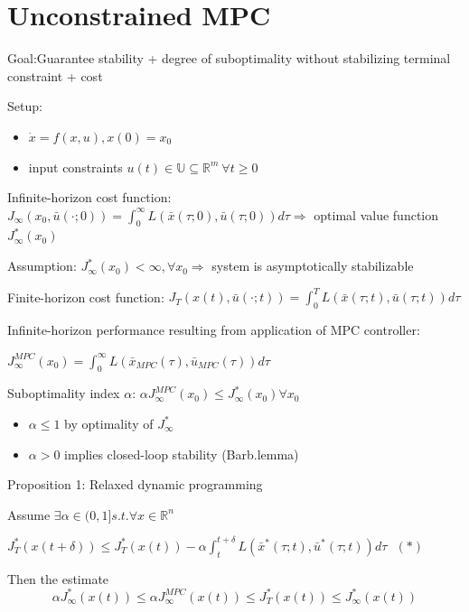 \section{Unconstrained MPC}\label{chap3}

Goal:Guarantee stability + degree of suboptimality
without stabilizing terminal constraint + cost

Setup: 
\begin{itemize}
\item $\dot x = f(x,u), x(0)=x_0$
\item input constraints $u(t) \in \mathbb{U} \subseteq \mathbb{R}^m \ \forall t \geq 0$
\end{itemize}

Infinite-horizon cost function:
$J_{\infty}(x_0, \bar{u}(\cdot; 0)) = \int_{0}^{\infty}L(\bar x(\tau;0), \bar u(\tau;0))d\tau  \Rightarrow$ optimal value function $J_{\infty}^*(x_0)$

Assumption: $J^{*}_{\infty}(x_0) < \infty, \forall x_0 \Rightarrow$ system is asymptotically stabilizable

Finite-horizon cost function:
$J_{T}(x(t), \bar{u}(\cdot; t)) = \int_{0}^{T}L(\bar x(\tau;t), \bar u(\tau;t))d\tau$

Infinite-horizon performance resulting from application of MPC controller:

$J_{\infty}^{MPC}(x_0) = \int_{0}^{\infty}L(\bar x_{MPC}(\tau), \bar u_{MPC}(\tau))d\tau$

\begin{Definition}
Suboptimality index $\alpha$:
$\alpha J_{\infty}^{MPC}(x_0) \leq J_{\infty}^{*}(x_0) \forall x_0$

\begin{itemize}
\item $\alpha \leq 1$ by optimality of $J^{*}_{\infty}$
\item $\alpha > 0$ implies closed-loop stability (Barb.lemma)
\end{itemize}
\end{Definition}

Proposition 1: Relaxed dynamic programming
 
Assume $\exists \alpha \in (0,1] s.t. \forall x \in \mathbb{R}^n$

$J_{T}^{*}(x(t+\delta)) \leq J_T^*(x(t)) - \alpha\int_{t}^{t+\delta}L(\bar x^*(\tau;t),\bar u^*(\tau;t))d\tau \ \ \ (*)$

Then the estimate 
\begin{equation}\label{main_inequility}
\alpha J_{\infty}^*(x(t)) \leq \alpha J_{\infty}^{MPC}(x(t)) \leq J_T^*(x(t)) \leq J_{\infty}^*(x(t))
\end{equation}


